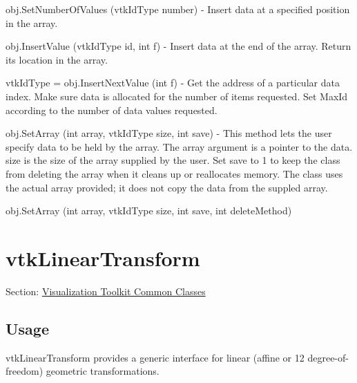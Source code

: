 \begin{DoxyItemize}
\item {\ttfamily obj.\-Set\-Number\-Of\-Values (vtk\-Id\-Type number)} -\/ Insert data at a specified position in the array.  
\item {\ttfamily obj.\-Insert\-Value (vtk\-Id\-Type id, int f)} -\/ Insert data at the end of the array. Return its location in the array.  
\item {\ttfamily vtk\-Id\-Type = obj.\-Insert\-Next\-Value (int f)} -\/ Get the address of a particular data index. Make sure data is allocated for the number of items requested. Set Max\-Id according to the number of data values requested.  
\item {\ttfamily obj.\-Set\-Array (int array, vtk\-Id\-Type size, int save)} -\/ This method lets the user specify data to be held by the array. The array argument is a pointer to the data. size is the size of the array supplied by the user. Set save to 1 to keep the class from deleting the array when it cleans up or reallocates memory. The class uses the actual array provided; it does not copy the data from the suppled array.  
\item {\ttfamily obj.\-Set\-Array (int array, vtk\-Id\-Type size, int save, int delete\-Method)}  
\end{DoxyItemize}\hypertarget{vtkcommon_vtklineartransform}{}\section{vtk\-Linear\-Transform}\label{vtkcommon_vtklineartransform}
Section\-: \hyperlink{sec_vtkcommon}{Visualization Toolkit Common Classes} \hypertarget{vtkwidgets_vtkxyplotwidget_Usage}{}\subsection{Usage}\label{vtkwidgets_vtkxyplotwidget_Usage}
vtk\-Linear\-Transform provides a generic interface for linear (affine or 12 degree-\/of-\/freedom) geometric transformations.

